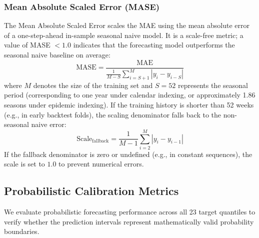 \subsubsection{Mean Absolute Scaled Error (MASE)}
The Mean Absolute Scaled Error scales the MAE using the mean absolute error of a one-step-ahead in-sample seasonal naive model. It is a scale-free metric; a value of MASE $<1.0$ indicates that the forecasting model outperforms the seasonal naive baseline on average:
\begin{equation}
\text{MASE} = \frac{\text{MAE}}{\frac{1}{M-S}\sum_{i=S+1}^M |y_i - y_{i-S}|}
\end{equation}
where $M$ denotes the size of the training set and $S=52$ represents the seasonal period (corresponding to one year under calendar indexing, or approximately 1.86 seasons under epidemic indexing). If the training history is shorter than 52 weeks (e.g., in early backtest folds), the scaling denominator falls back to the non-seasonal naive error:
\begin{equation}
\text{Scale}_{\text{fallback}} = \frac{1}{M-1}\sum_{i=2}^M |y_i - y_{i-1}|
\end{equation}
If the fallback denominator is zero or undefined (e.g., in constant sequences), the scale is set to $1.0$ to prevent numerical errors.

\subsection{Probabilistic Calibration Metrics}
We evaluate probabilistic forecasting performance across all 23 target quantiles to verify whether the prediction intervals represent mathematically valid probability boundaries.

